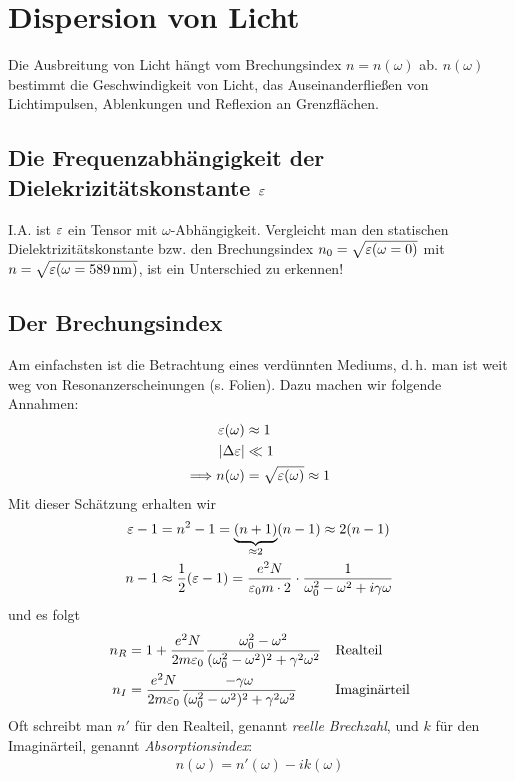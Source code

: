 \chapter{Dispersion von Licht}
Die Ausbreitung von Licht hängt vom Brechungsindex $n=n(\omega)$
ab. $n(\omega)$ bestimmt die Geschwindigkeit von Licht, das
Auseinanderfließen von Lichtimpulsen, Ablenkungen und Reflexion an
Grenzflächen. 

\section{Die Frequenzabhängigkeit der Dielekrizitätskonstante $\varepsilon$}
I.A. ist $\varepsilon$ ein Tensor mit $\omega$-Abhängigkeit. Vergleicht man
den statischen Dielektrizitätskonstante bzw. den Brechungsindex
$n_0=\sqrt{\varepsilon(\omega=0)}$ mit $
n=\sqrt{\varepsilon(\omega=\SI{589}{\nano\meter})}$, ist ein Unterschied zu erkennen!

\section{Der Brechungsindex}
Am einfachsten ist die Betrachtung eines verdünnten Mediums,
d.\,h. man ist weit weg von Resonanzerscheinungen (s. Folien).
Dazu machen wir folgende Annahmen:
\begin{align*}
  \varepsilon(\omega) &\approx 1\\
  |\Delta\varepsilon| &\ll 1\\
\Longrightarrow n(\omega) &= \sqrt{\varepsilon(\omega)} \approx 1
\end{align*}
Mit dieser Schätzung erhalten wir
\begin{align*}
  \varepsilon - 1 &= n^2-1 = \underbrace{(n+1)}_{\approx 2}(n-1) \approx 2(n-1)\\
  n-1 &\approx \frac{1}{2} (\varepsilon -1) 
  = \frac{e^2N}{\varepsilon_0 m\cdot 2}\cdot
  \frac{1}{\omega_0^2-\omega^2 + i\gamma\omega}
\end{align*}
und es folgt
\begin{align*}
  n_R &= 1 + \frac{e^2N}{2m\varepsilon_0} 
        \frac{\omega_0^2-\omega^2}{(\omega_0^2-\omega^2)^2 + \gamma^2\omega^2}
  && \text{Realteil}\\
  n_I &= \frac{e^2N}{2m\varepsilon_0}
        \frac{-\gamma\omega}{(\omega_0^2-\omega^2)^2 + \gamma^2\omega^2}
  && \text{Imaginärteil}\\
\end{align*}
Oft schreibt man $n'$ für den Realteil, genannt 
\emph{reelle Brechzahl}, und 
$k$ für den Imaginärteil, genannt
\emph{Absorptionsindex}:
\begin{gather*}
  n(\omega) = n'(\omega) - ik(\omega)
\end{gather*}%
%
%


